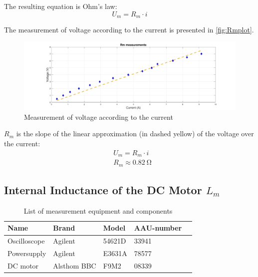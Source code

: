 The resulting equation is Ohm's law:
\begin{equation}
U_m = R_m \cdot i
\end{equation}


The measurement of voltage according to the current is presented in \autoref{fig:Rmplot}.
\begin{figure}[htbp]
	\includegraphics[width=1\textwidth]{figures/appendix/Motor&GearTests/plotRm}
	\caption{Measurement of voltage according to the current} \label{fig:Rmplot}
\end{figure}

$R_m$ is the slope of the linear approximation (in dashed yellow) of the voltage over the current: 
\begin{subequations} \label{eq:LaEq}
	\begin{flalign}
		&U_m = R_m \cdot i \\
		&R_m \approx \SI{0.82}{\ohm}
	\end{flalign}
\end{subequations}

\newpage
\subsection{Internal Inductance of the DC Motor $L_m$}
\begin{table}[htbp]
	\centering
	\caption{List of measurement equipment and components}\label{tab_appendix:LaSetUp}

	\begin{tabularx}{\textwidth}{lXXXX}
		Name 				& Brand	& Model & AAU-number									\\ \toprule \rowcolor{lightGrey}
		Oscilloscope	& Agilent & 54621D & 33941 	\\
		Powersupply	& Agilent & E3631A & 78577\\ \rowcolor{lightGrey}
		DC motor & Alsthom BBC & F9M2& 08339 
	\end{tabularx}
\end{table}
